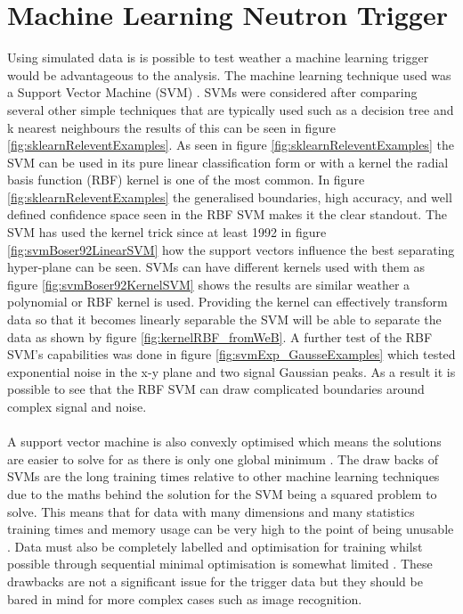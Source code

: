 \section{Machine Learning Neutron Trigger}\label{sec:MachineLearningTrigger}
Using simulated data is is possible to test weather a machine learning trigger would be advantageous to the analysis. The machine learning technique used was a Support Vector Machine (SVM) \cite{Boser92atraining} \cite{cortes1995support}. SVMs were considered after comparing several other simple techniques that are typically used such as a decision tree and k nearest neighbours the results of this can be seen in figure \ref{fig:sklearnReleventExamples}. As seen in figure \ref{fig:sklearnReleventExamples} the SVM can be used in its pure linear classification form or with a kernel the radial basis function (RBF) kernel is one of the most common. In figure \ref{fig:sklearnReleventExamples} the generalised boundaries, high accuracy, and well defined confidence space seen in the RBF SVM makes it the clear standout. The SVM has used the kernel trick since at least 1992 \cite{Boser92atraining} in figure \ref{fig:svmBoser92LinearSVM} how the support vectors influence the best separating hyper-plane can be seen. SVMs can have different kernels used with them as figure \ref{fig:svmBoser92KernelSVM} shows the results are similar weather a polynomial or RBF kernel is used. Providing the kernel can effectively transform data so that it becomes linearly separable the SVM will be able to separate the data as shown by figure \ref{fig:kernelRBF_fromWeB}. A further test of the RBF SVM's capabilities was done in figure \ref{fig:svmExp_GausseExamples} which tested exponential noise in the x-y plane and two signal Gaussian peaks. As a result it is possible to see that the RBF SVM can draw complicated boundaries around complex signal and noise. \\\\A support vector machine is also convexly optimised which means the solutions are easier to solve for as there is only one global minimum \cite{cortes1995support}. The draw backs of SVMs are the long training times relative to other machine learning techniques  due to the maths behind the solution for the SVM being a squared problem to solve\cite{cortes1995support}. This means that for data with many dimensions and many statistics training times and memory usage can be very high to the point of being unusable \cite{cortes1995support}. Data must also be completely labelled and optimisation for training whilst possible through sequential minimal optimisation is somewhat limited \cite{platt1998sequential}. These drawbacks are not a significant issue for the trigger data but they should be bared in mind for more complex cases such as image recognition.
 
